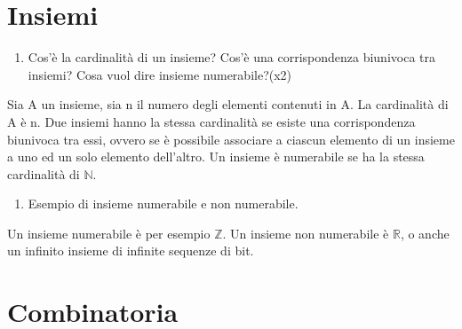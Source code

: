 \section{Insiemi}

\begin{enumerate} \bfseries
\item Cos'è la cardinalità di un insieme? Cos'è una corrispondenza biunivoca tra insiemi? Cosa vuol dire insieme numerabile?(x2)
\end{enumerate}
Sia A un insieme, sia n il numero degli elementi contenuti in A. La cardinalità di A è n. Due insiemi hanno la stessa cardinalità se esiste una corrispondenza biunivoca tra essi, ovvero se è possibile associare a ciascun elemento di un insieme a uno ed un solo elemento dell'altro. Un insieme è numerabile se ha la stessa cardinalità di $\mathbb{N}$.
\begin{enumerate}[resume]\bfseries
\item Esempio di insieme numerabile e non numerabile.
\end{enumerate}
Un insieme numerabile è per esempio $\mathbb{Z}$. Un insieme non numerabile è $\mathbb{R}$, o anche un infinito insieme di infinite sequenze di bit.

\section{Combinatoria}

